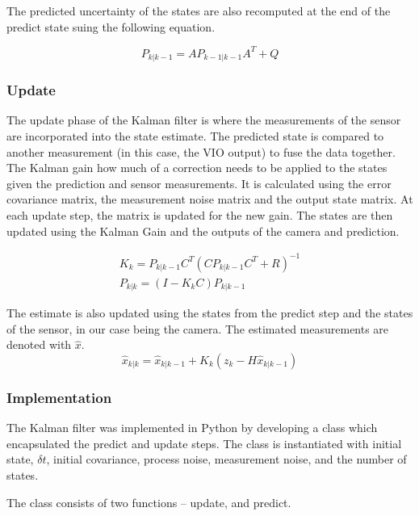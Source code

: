 \documentclass[bare_jrnl_transmag]{subfiles}
\begin{document}
The predicted uncertainty of the states are also recomputed at the end of the predict state suing the following equation.

\begin{equation*}
    P_{k|k-1} = A P_{k-1|k-1} A^T + Q
\end{equation*}
\newline

\subsubsection{Update}
The update phase of the Kalman filter is where the measurements of the sensor are incorporated into the state estimate. The predicted state is compared to another measurement (in this case, the VIO output) to fuse the data together. 
The Kalman gain how much of a correction needs to be applied to the states given the prediction and sensor measurements. It is calculated using the error covariance matrix, the measurement noise matrix and the output state matrix. 
At each update step, the matrix is updated for the new gain. The states are then updated using the Kalman Gain and the outputs of the camera and prediction.

\begin{eqnarray*}
    K_k = P_{k|k-1} C^T (C P_{k|k-1} C^T + R)^{-1} \\[1em]
    P_{k|k} = (I - K_k C) P_{k|k-1}
\end{eqnarray*}

The estimate is also updated using the states from the predict step and the states of the sensor, in our case being the camera. 
The estimated measurements are denoted with $\hat{x}$. 
\begin{equation*}
    \hat{x}_{k|k} = \hat{x}_{k|k-1} + K_k (z_k - H \hat{x}_{k|k-1})
\end{equation*}
\newline

\subsubsection{Implementation}

The Kalman filter was implemented in Python by developing a class which encapsulated the predict and update steps. The class is instantiated with initial state, $\delta t$, initial covariance, process noise, measurement noise, and the number of states. 

The class consists of two functions -- update, and predict.\newline
\end{document}
